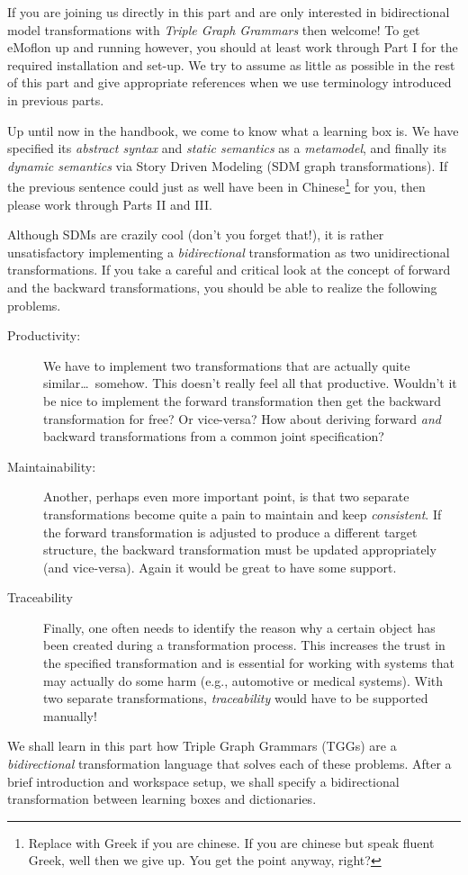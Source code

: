 \genHeader
\label{chap:Learning-Box-to-Dictionary-and-Back-Again}

If you are joining us directly in this part and are only interested in bidirectional model transformations with \emph{Triple Graph Grammars} then welcome! To
get eMoflon up and running however, you should at least work through Part I for the required installation and set-up. We try to assume as little as possible in
the rest of this part and give appropriate references when we use terminology introduced in previous parts.

Up until now in the handbook, we come to know what a learning box is. We have specified its \emph{abstract syntax} and \emph{static semantics} as a
\emph{metamodel}, and finally its \emph{dynamic semantics} via Story Driven Modeling (SDM graph transformations). If the previous sentence could just as well
have been in Chinese\footnote{Replace with Greek if you are chinese.  If you are chinese but speak fluent Greek, well then we give up. You get the point
anyway, right?} for you, then please work through Parts II and III.

Although SDMs are crazily cool (don't you forget that!), it is rather unsatisfactory implementing a \emph{bidirectional} transformation as two unidirectional
transformations. If you take a careful and critical look at the concept of forward and the backward transformations, you should be able to realize the following
problems.

\begin{description}
  \item[Productivity:] We have to implement two transformations that are actually quite similar\ldots ~somehow. This doesn't really feel all that productive.
  Wouldn't it be nice to implement the forward transformation then get the backward transformation for free?  Or vice-versa?  How about deriving forward 
  \emph{and} backward transformations from a common joint specification?
  
  \vspace{0.5cm}
  
  \item[Maintainability:] Another, perhaps even more important point, is that two separate transformations become quite a pain to maintain and keep
  \emph{consistent}.  If the forward transformation is adjusted to produce a different target structure, the backward transformation must be updated
  appropriately (and vice-versa).  Again it would be great to have some support.
  
  \item[Traceability] Finally, one often needs to identify the reason why a certain object has been created during a transformation process. This increases the
  trust in the specified transformation and is essential for working with systems that may actually do some harm (e.g., automotive or medical     
  systems). With two separate transformations, \emph{traceability} would have to be supported manually!
\end{description}

We shall learn in this part how Triple Graph Grammars (TGGs) are a \emph{bidirectional} transformation language that solves each of these problems. After a
brief introduction and workspace setup, we shall specify a bidirectional transformation between learning boxes and dictionaries.
